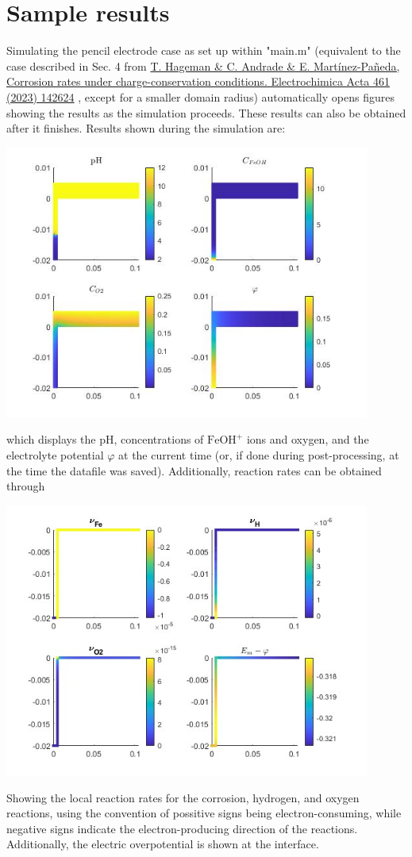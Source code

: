 \documentclass[3p]{elsarticle} %
\newcommand{\citeMe}{\href{https://doi.org/10.1016/j.electacta.2023.142624}{T. Hageman \& C. Andrade \& E. Martínez-Pañeda, Corrosion rates under charge-conservation conditions. Electrochimica Acta 461 (2023) 142624} \citep{Hageman2023}}
\begin{document}
\section{Sample results}
Simulating the pencil electrode case as set up within "main.m" (equivalent to the case described in Sec. 4 from \citeMe{}, except for a smaller domain radius) automatically opens figures showing the results as the simulation proceeds. These results can also be obtained after it finishes. Results shown during the simulation are:

\begin{center}
\includegraphics[width=12cm]{../Figures/Surfs.jpg}
\end{center}
which displays the pH, concentrations of $\mathrm{FeOH}^+$ ions and oxygen, and the electrolyte potential $\varphi$ at the current time (or, if done during post-processing, at the time the datafile was saved). Additionally, reaction rates can be obtained through

\begin{center}
\includegraphics[width=12cm]{../Figures/Rates.jpg}
\end{center}
Showing the local reaction rates for the corrosion, hydrogen, and oxygen reactions, using the convention of possitive signs being electron-consuming, while negative signs indicate the electron-producing direction of the reactions. Additionally, the electric overpotential is shown at the interface.
\end{document}
